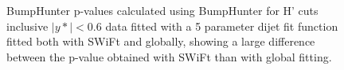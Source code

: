 \begin{figure}[!htb]
  \centering
  \caption{BumpHunter p-values calculated using BumpHunter for H' cuts inclusive $|y*|<0.6$ data fitted with a 5 parameter dijet fit function fitted both with SWiFt and globally, showing a large difference between the p-value obtained with SWiFt than with global fitting.}
  \label{fig:ystar0.6FullRunBHPvalue}
\end{figure}

